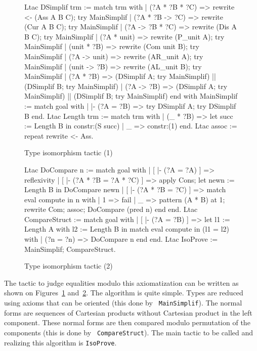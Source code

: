 \begin{coq_example}
\begin{figure}[ht]
\begin{centerframe}
\begin{coq_example}
Ltac DSimplif trm :=
  match trm with
  | (?A * ?B * ?C) =>
      rewrite <- (Ass A B C); try MainSimplif
  | (?A * ?B -> ?C) =>
      rewrite (Cur A B C); try MainSimplif
  | (?A -> ?B * ?C) =>
      rewrite (Dis A B C); try MainSimplif
  | (?A * unit) =>
      rewrite (P_unit A); try MainSimplif
  | (unit * ?B) =>
      rewrite (Com unit B); try MainSimplif
  | (?A -> unit) =>
      rewrite (AR_unit A); try MainSimplif
  | (unit -> ?B) =>
      rewrite (AL_unit B); try MainSimplif
  | (?A * ?B) =>
      (DSimplif A; try MainSimplif) || (DSimplif B; try MainSimplif)
  | (?A -> ?B) =>
      (DSimplif A; try MainSimplif) || (DSimplif B; try MainSimplif)
  end
 with MainSimplif :=
  match goal with
  | |- (?A = ?B) => try DSimplif A; try DSimplif B
  end.
Ltac Length trm :=
  match trm with
  | (_ * ?B) => let succ := Length B in constr:(S succ)
  | _ => constr:(1)
  end.
Ltac assoc := repeat rewrite <- Ass.
\end{coq_example}
\end{centerframe}
\caption{Type isomorphism tactic (1)}
\label{isosltac1}
\end{figure}

\begin{figure}[ht]
\begin{centerframe}
\begin{coq_example}
Ltac DoCompare n :=
  match goal with
  | [ |- (?A = ?A) ] => reflexivity
  | [ |- (?A * ?B = ?A * ?C) ] =>
      apply Cons; let newn := Length B in
                  DoCompare newn
  | [ |- (?A * ?B = ?C) ] =>
      match eval compute in n with
      | 1 => fail
      | _ =>
          pattern (A * B) at 1; rewrite Com; assoc; DoCompare (pred n)
      end
  end.
Ltac CompareStruct :=
  match goal with
  | [ |- (?A = ?B) ] =>
      let l1 := Length A
      with l2 := Length B in
      match eval compute in (l1 = l2) with
      | (?n = ?n) => DoCompare n
      end
  end.
Ltac IsoProve := MainSimplif; CompareStruct.
\end{coq_example}
\end{centerframe}
\caption{Type isomorphism tactic (2)}
\label{isosltac2}
\end{figure}

The tactic to judge equalities modulo this axiomatization can be written as
shown on Figures~\ref{isosltac1} and~\ref{isosltac2}. The algorithm is quite
simple. Types are reduced using axioms that can be oriented (this done by {\tt
MainSimplif}). The normal forms are sequences of Cartesian
products without Cartesian product in the left component. These normal forms
are then compared modulo permutation of the components (this is done by {\tt
CompareStruct}). The main tactic to be called and realizing this algorithm is
{\tt IsoProve}.


\end{coq_example}
